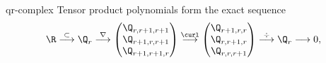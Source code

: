 \begin{Lemma}{qr-complex}
  Tensor product polynomials form the exact sequence
  \begin{gather}
    \R
    \overset{\subset}{\longrightarrow} \Q_r
    \overset{\nabla}{\longrightarrow}
    \begin{pmatrix}
      \Q_{r,r+1,r+1}\\\Q_{r+1,r,r+1}\\\Q_{r+1,r+1,r}
    \end{pmatrix}
    \overset{\curl}{\longrightarrow}
    \begin{pmatrix}
      \Q_{r+1,r,r}\\\Q_{r,r+1,r}\\\Q_{r,r,r+1}
    \end{pmatrix}
    \overset{\div}{\longrightarrow}
    \Q_r
    \longrightarrow 0,    
  \end{gather}
\end{Lemma}

